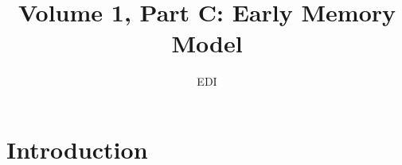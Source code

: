 \documentclass[a4paper,twoside]{scrbook}
\begin{document}
\title{Volume 1, Part C: Early Memory Model}
\author{EDI}
\frontmatter
\maketitle
\tableofcontents
\mainmatter

\chapter{Introduction}
\end{document}
